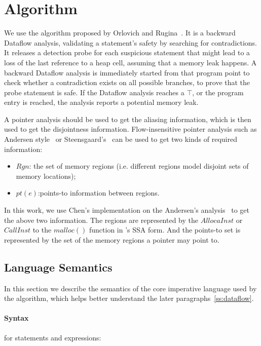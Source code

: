 \section{Algorithm}
\label{s:algorithm}

We use the algorithm proposed by Orlovich and Rugina~\cite{rugina}. It is a 
backward Dataflow analysis, validating a statement's safety by searching for 
contradictions. It releases a detection probe for each suspicious statement 
that might lead to a loss of the last reference to a heap cell, assuming that 
a memory leak happens. A backward Dataflow analysis is immediately started from
that program point to check whether a contradiction exists on all possible 
branches, to prove that the probe statement is safe. If the Dataflow analysis 
reaches a $\top$, or the program entry is reached, the analysis reports a 
potential memory leak.

A pointer analysis should be used to get the aliasing information, 
which is then used to get the disjointness information. Flow-insensitive 
pointer analysis such as Andersen style~\cite{andersen} or 
Steensgaard's~\cite{steensgaard} can be used to get two kinds of required 
information:

\begin{itemize}
  \item $Rgn$: the set of memory regions 
    (i.e. different regions model disjoint sets of memory locations);
  \item $pt(e)$:points-to information between regions.
\end{itemize}

In this work, we use Chen's implementation on the Andersen's 
analysis~\cite{chen} to get the above two information.
The regions are represented by the $AllocaInst$ or $CallInst$ to the $malloc()$ 
function in \llvm's SSA form. And the points-to set is represented by the 
set of the memory regions a pointer may point to.


\subsection{Language Semantics}
\label{ss:semantics}

In this section we describe the semantics of the core imperative language 
used by the algorithm, which helps better understand the later 
paragraphs~\ref{ss:dataflow}.

\paragraph{Syntax} for statements and expressions: \\

